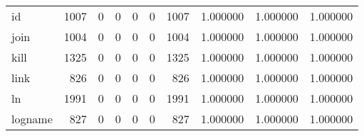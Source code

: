 \begin{tabular}{lrrrrrrrrr}
id        &                                1007 &                                               0 &                                              0 &                                             0 &                                              0 &                                         1007 &                                           1.000000 &                               1.000000 &                             1.000000 \\
join      &                                1004 &                                               0 &                                              0 &                                             0 &                                              0 &                                         1004 &                                           1.000000 &                               1.000000 &                             1.000000 \\
kill      &                                1325 &                                               0 &                                              0 &                                             0 &                                              0 &                                         1325 &                                           1.000000 &                               1.000000 &                             1.000000 \\
link      &                                 826 &                                               0 &                                              0 &                                             0 &                                              0 &                                          826 &                                           1.000000 &                               1.000000 &                             1.000000 \\
ln        &                                1991 &                                               0 &                                              0 &                                             0 &                                              0 &                                         1991 &                                           1.000000 &                               1.000000 &                             1.000000 \\
logname   &                                 827 &                                               0 &                                              0 &                                             0 &                                              0 &                                          827 &                                           1.000000 &                               1.000000 &                             1.000000 \\

\end{tabular}

